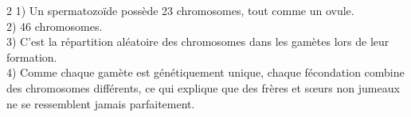 \begin{multicols}{2}
1) Un spermatozoïde possède 23 chromosomes, tout comme un ovule.\\
2) 46 chromosomes.\\
3) C'est la répartition aléatoire des chromosomes dans les gamètes lors de leur
formation.\\
4) Comme chaque gamète est génétiquement unique, chaque fécondation combine des
chromosomes différents, ce qui explique que des frères et sœurs non jumeaux ne se
ressemblent jamais parfaitement.

\end{multicols}
\exercicesBanner
